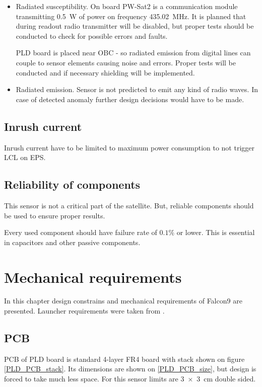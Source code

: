 \begin{itemize}
        \item Radiated susceptibility.
            On board PW-Sat2 is a communication module transmitting \SI{0.5}{\watt} of power on frequency \SI{435.02}{\mega\hertz}. It is planned that during readout radio transmitter will be disabled, but proper tests should be conducted to check for possible errors and faults.

            PLD board is placed near OBC - so radiated emission from digital lines can couple to sensor elements causing noise and errors. Proper tests will be conducted and if necessary shielding will be implemented.

        \item Radiated emission.
            Sensor is not predicted to emit any kind of radio waves. In case of detected anomaly further design decisions would have to be made.

    \end{itemize}


\subsection{Inrush current}
    Inrush current have to be limited to maximum power consumption to not trigger LCL on EPS.

\subsection{Reliability of components}
    This sensor is not a critical part of the satellite. But, reliable components should be used to ensure proper results. 

    Every used component should have failure rate of $0.1\si{\percent}$ or lower. This is essential in capacitors and other passive components.


\section{Mechanical requirements}
    In this chapter design constrains and mechanical requirements of Falcon9 are presented. Launcher requirements were taken from \cite{Falcon9_user_manual}.

\subsection{PCB}
\label{PCB_description}
    PCB of PLD board is standard 4-layer FR4 board with stack shown on figure \ref{PLD_PCB_stack}. Its dimensions are shown on \ref{PLD_PCB_size}, but design is forced to take much less space. For this sensor limits are \SI{3x3}{\centi\meter} double sided.

